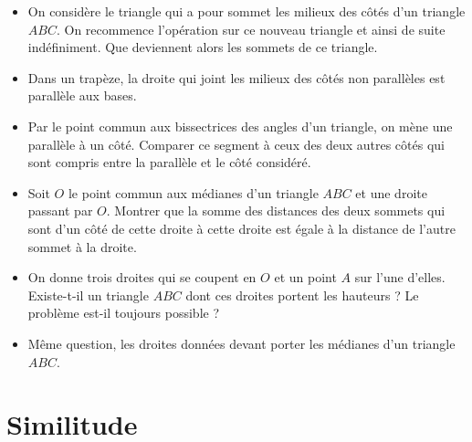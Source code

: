 \documentclass[12 pt]{report}
\theoremstyle{plain}
\newcounter{n}
\renewcommand{\it}{\item[$\mathbf{\then}.$]\stepcounter{n} }
\begin{document}
\begin{itemize}
 \it On considère le triangle qui a pour sommet les milieux des côtés d'un triangle $ABC$. On recommence l'opération sur ce nouveau triangle et ainsi de suite indéfiniment. Que deviennent alors les sommets de ce triangle. 
 \it Dans un trapèze, la droite qui joint les milieux des côtés non parallèles est parallèle aux bases. 
 \it Par le point commun aux bissectrices des angles d'un triangle, on mène une parallèle à un côté. Comparer ce segment à ceux des deux autres côtés qui sont compris entre la parallèle et le côté considéré. 
 \it Soit $O$ le point commun aux médianes d'un triangle $ABC$ et une droite passant par $O$. Montrer que la somme des distances des deux sommets qui sont d'un côté de cette droite à cette droite est égale à la distance de l'autre sommet à la droite. 
 \it On donne trois droites qui se coupent en $O$ et un point $A$ sur l'une d'elles. Existe-t-il un triangle $ABC$ dont ces droites portent les hauteurs ? Le problème est-il toujours possible ? 
 \it Même question, les droites données devant porter les médianes d'un triangle $ABC$.
 \end{itemize}
 
 \chapter{Similitude}
 
\end{document}
